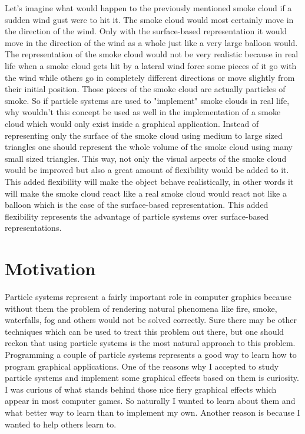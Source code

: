 Let's imagine what would happen to the previously mentioned smoke cloud if a sudden wind gust were to hit it. The smoke cloud would most certainly move in the direction of the wind. Only with the surface-based representation it would move in the direction of the wind as a whole just like a very large balloon would. The representation of the smoke cloud would not be very realistic because in real life when a smoke cloud gets hit by a lateral wind force some pieces of it go with the wind while others go in completely different directions or move slightly from their initial position. Those pieces of the smoke cloud are actually particles of smoke. So if particle systems are used to "implement" smoke clouds in real life, why wouldn't this concept be used as well in the implementation of a smoke cloud which would only exist inside a graphical application. Instead of representing only the surface of the smoke cloud using medium to large sized triangles one should represent the whole volume of the smoke cloud using many small sized triangles. This way, not only the visual aspects of the smoke cloud would be improved but also a great amount of flexibility would be added to it. This added flexibility will make the object behave realistically, in other words it will make the smoke cloud react like a real smoke cloud would react not like a balloon which is the case of the surface-based representation. This added flexibility represents the advantage of particle systems over surface-based representations.\\
\newpage
\section{Motivation}
Particle systems represent a fairly important role in computer graphics because without them the problem of rendering natural phenomena like fire, smoke, waterfalls, fog and others would not be solved correctly. Sure there may be other techniques which can be used to treat this problem out there, but one should reckon that using particle systems is the most natural approach to this problem.\\

Programming a couple of particle systems represents a good way to learn how to program graphical applications. One of the reasons why I accepted to study particle systems and implement some graphical effects based on them is curiosity. I was curious of what stands behind those nice fiery graphical effects which appear in most computer games. So naturally I wanted to learn about them and what better way to learn than to implement my own. Another reason is because I wanted to help others learn to.\\

